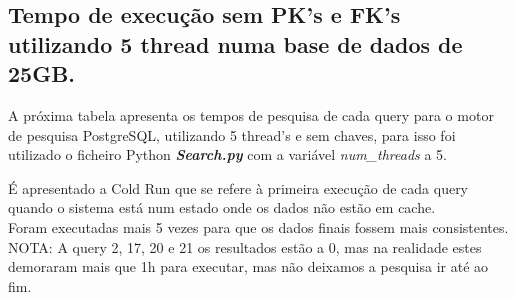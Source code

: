 \documentclass{article}
\begin{document}
\clearpage
\subsection{Tempo de execução sem PK's e FK's utilizando 5 thread numa base de dados de 25GB.}
\texttt{}\par A próxima tabela apresenta os tempos de pesquisa de cada query para o motor de pesquisa PostgreSQL, utilizando 5 thread's e sem chaves, para isso foi utilizado o ficheiro Python \textbf{\textit{Search.py}}  com a variável \textit{num\_threads} a 5. 
\texttt{}\par É apresentado a Cold Run que se refere à primeira execução de cada query quando o sistema está num estado onde os dados não estão em cache.\\
Foram executadas mais 5 vezes para que os dados finais fossem mais consistentes.\\
NOTA: A query 2, 17, 20 e 21 os resultados estão a 0, mas na realidade estes demoraram mais que 1h para executar, mas não deixamos a pesquisa ir até ao fim.
\end{document}

